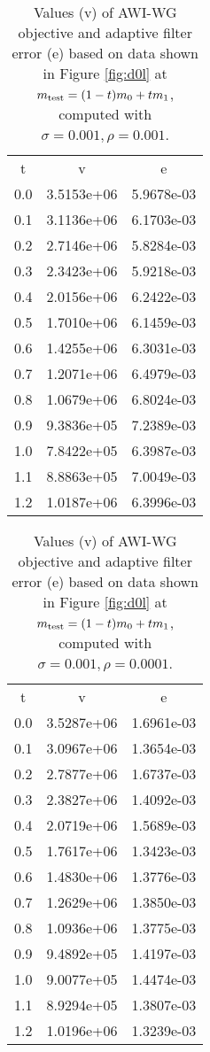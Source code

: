 \begin{table}
  \begin{center}
  \begin{tabular}{c|c|c}
    \hline
    t & v & e \\
    0.0 & 3.5153e+06 & 5.9678e-03 \\
0.1 & 3.1136e+06 & 6.1703e-03 \\
0.2 & 2.7146e+06 & 5.8284e-03 \\
0.3 & 2.3423e+06 & 5.9218e-03 \\
0.4 & 2.0156e+06 & 6.2422e-03 \\
0.5 & 1.7010e+06 & 6.1459e-03 \\
0.6 & 1.4255e+06 & 6.3031e-03 \\
0.7 & 1.2071e+06 & 6.4979e-03 \\
0.8 & 1.0679e+06 & 6.8024e-03 \\
0.9 & 9.3836e+05 & 7.2389e-03 \\
1.0 & 7.8422e+05 & 6.3987e-03 \\
1.1 & 8.8863e+05 & 7.0049e-03 \\
1.2 & 1.0187e+06 & 6.3996e-03 \\
        \hline 
  \end{tabular}
   \caption{Values (v) of AWI-WG objective and adaptive filter error (e) based on data shown in Figure \ref{fig:d0l} at $m_{\rm test} = (1-t)m_0 + t m_1$, computed with $\sigma=0.001, \rho = 0.001$.}
    \label{table:m1rho001}
  \end{center}
\end{table}
                   
\begin{table}
  \begin{center}
  \begin{tabular}{c|c|c}
    \hline
    t & v & e \\
    0.0 & 3.5287e+06 & 1.6961e-03 \\
0.1 & 3.0967e+06 & 1.3654e-03 \\
0.2 & 2.7877e+06 & 1.6737e-03 \\
0.3 & 2.3827e+06 & 1.4092e-03 \\
0.4 & 2.0719e+06 & 1.5689e-03 \\
0.5 & 1.7617e+06 & 1.3423e-03 \\
0.6 & 1.4830e+06 & 1.3776e-03 \\
0.7 & 1.2629e+06 & 1.3850e-03 \\
0.8 & 1.0936e+06 & 1.3775e-03 \\
0.9 & 9.4892e+05 & 1.4197e-03 \\
1.0 & 9.0077e+05 & 1.4474e-03 \\
1.1 & 8.9294e+05 & 1.3807e-03 \\
1.2 & 1.0196e+06 & 1.3239e-03 \\
        \hline 
  \end{tabular}
   \caption{Values (v) of AWI-WG objective and adaptive filter error (e) based on data shown in Figure \ref{fig:d0l} at $m_{\rm test} = (1-t)m_0 + t m_1$, computed with $\sigma=0.001, \rho = 0.0001$.}
    \label{table:m1rho0001}
  \end{center}
\end{table}

